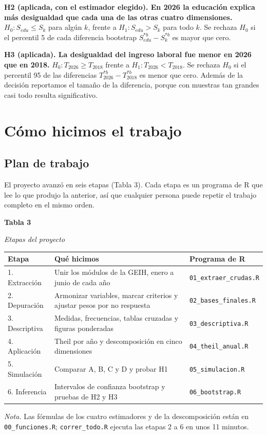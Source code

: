 \documentclass[12pt,letterpaper]{article}
\newcommand{\apa}[4]{%
  \singlespacing\raggedright
  {\bfseries #1\par}\vspace{0.4\baselineskip}
  {\itshape #2\par}\vspace{0.4\baselineskip}
  #3\par\vspace{0.3\baselineskip}
  {\small {\itshape Nota.} #4\par}}
\begin{document}
\textbf{H2 (aplicada, con el estimador elegido). En 2026 la educación explica más desigualdad que cada una de las otras cuatro dimensiones.} $H_0: S_{edu} \leq S_k$ para algún $k$, frente a $H_1: S_{edu} > S_k$ para todo $k$. Se rechaza $H_0$ si el percentil 5 de cada diferencia bootstrap $S_{edu}^{*b} - S_k^{*b}$ es mayor que cero.

\textbf{H3 (aplicada). La desigualdad del ingreso laboral fue menor en 2026 que en 2018.} $H_0: T_{2026} \geq T_{2018}$ frente a $H_1: T_{2026} < T_{2018}$. Se rechaza $H_0$ si el percentil 95 de las diferencias $T_{2026}^{*b} - T_{2018}^{*b}$ es menor que cero. Además de la decisión reportamos el tamaño de la diferencia, porque con muestras tan grandes casi todo resulta significativo.

\section{Cómo hicimos el trabajo}

\subsection{Plan de trabajo}

El proyecto avanzó en seis etapas (Tabla 3). Cada etapa es un programa de R que lee lo que produjo la anterior, así que cualquier persona puede repetir el trabajo completo en el mismo orden.

\begin{table}[!htb]
\apa{Tabla 3}{Etapas del proyecto}{%
  \small\renewcommand{\arraystretch}{1.0}
  \begin{tabular}{@{}l>{\raggedright\arraybackslash}p{3.4in}>{\raggedright\arraybackslash}p{1.7in}@{}}
    \toprule
    Etapa & Qué hicimos & Programa de R \\
    \midrule
    1. Extracción & Unir los módulos de la GEIH, enero a junio de cada año & \texttt{01\_extraer\_crudas.R} \\
    2. Depuración & Armonizar variables, marcar criterios y ajustar pesos por no respuesta & \texttt{02\_bases\_finales.R} \\
    3. Descriptiva & Medidas, frecuencias, tablas cruzadas y figuras ponderadas & \texttt{03\_descriptiva.R} \\
    4. Aplicación & Theil por año y descomposición en cinco dimensiones & \texttt{04\_theil\_anual.R} \\
    5. Simulación & Comparar A, B, C y D y probar H1 & \texttt{05\_simulacion.R} \\
    6. Inferencia & Intervalos de confianza bootstrap y pruebas de H2 y H3 & \texttt{06\_bootstrap.R} \\
    \bottomrule
  \end{tabular}}{%
  Las fórmulas de los cuatro estimadores y de la descomposición están en \texttt{00\_funciones.R}; \texttt{correr\_todo.R} ejecuta las etapas 2 a 6 en unos 11 minutos.}
\end{table}
\end{document}
